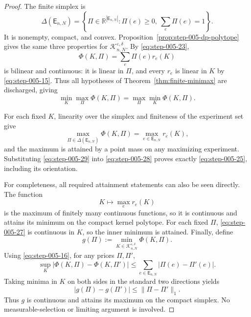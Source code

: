 \begin{proof}

The finite simplex is
\[
\Delta(\mathsf E_{n,N})
=
\left\{\Pi\in\mathbb R^{|\mathsf E_{n,N}|}:
\Pi(e)\ge0,\ \sum_e\Pi(e)=1\right\}.
\tag{26}\label{eq:step-005-26}
\]
It is nonempty, compact, and convex. Proposition~\ref{prop:step-005-dp-polytope} gives the same three properties for
\(\mathcal K_{n,N}^{\varepsilon,\delta}\). By \eqref{eq:step-005-23},
\[
\Phi(K,\Pi)=\sum_e\Pi(e)r_e(K)
\tag{27}\label{eq:step-005-27}
\]
is bilinear and continuous: it is linear in \(\Pi\), and every \(r_e\) is linear in \(K\) by \eqref{eq:step-005-15}. Thus all hypotheses of Theorem~\ref{thm:finite-minimax} are discharged, giving
\[
\min_K\max_\Pi\Phi(K,\Pi)
=
\max_\Pi\min_K\Phi(K,\Pi).
\tag{28}\label{eq:step-005-28}
\]

For each fixed \(K\), linearity over the simplex and finiteness of the experiment set give
\[
\max_{\Pi\in\Delta(\mathsf E_{n,N})}\Phi(K,\Pi)
=\max_{e\in\mathsf E_{n,N}}r_e(K),
\tag{29}\label{eq:step-005-29}
\]
and the maximum is attained by a point mass on any maximizing experiment. Substituting \eqref{eq:step-005-29} into \eqref{eq:step-005-28} proves exactly \eqref{eq:step-005-25}, including its orientation.

For completeness, all required attainment statements can also be seen directly. The function
\[
K\longmapsto\max_e r_e(K)
\tag{30}\label{eq:step-005-30}
\]
is the maximum of finitely many continuous functions, so it is continuous and attains its minimum on the compact kernel polytope. For each fixed \(\Pi\), \eqref{eq:step-005-27} is continuous in \(K\), so the inner minimum is attained. Finally, define
\[
g(\Pi):=\min_{K\in\mathcal K_{n,N}^{\varepsilon,\delta}}\Phi(K,\Pi).
\tag{31}\label{eq:step-005-31}
\]
Using \eqref{eq:step-005-16}, for any priors \(\Pi,\Pi'\),
\[
\sup_K|\Phi(K,\Pi)-\Phi(K,\Pi')|
\le\sum_{e\in\mathsf E_{n,N}}|\Pi(e)-\Pi'(e)|.
\tag{32}\label{eq:step-005-32}
\]
Taking minima in \(K\) on both sides in the standard two directions yields
\[
|g(\Pi)-g(\Pi')|
\le\|\Pi-\Pi'\|_1.
\tag{33}\label{eq:step-005-33}
\]
Thus \(g\) is continuous and attains its maximum on the compact simplex. No measurable-selection or limiting argument is involved.

\end{proof}


